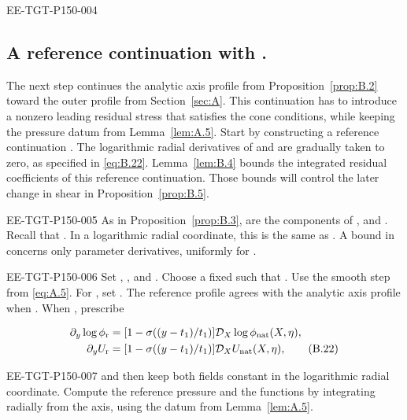 \begin{EESegment}{EE-TGT-P150-004}
\subsection{A reference continuation with
.}\label{sec:B.5}
The next step continues the analytic axis profile from Proposition~\ref{prop:B.2} toward the outer
profile from Section~\ref{sec:A}. This continuation has to introduce a nonzero leading residual
stress  that satisfies the cone conditions, while keeping the
pressure datum  from Lemma~\ref{lem:A.5}. Start by constructing a
reference continuation . The logarithmic radial
derivatives of  and  are gradually taken to zero,
as specified in \eqref{eq:B.22}. Lemma~\ref{lem:B.4} bounds the integrated residual coefficients
of this reference continuation. Those bounds will control the later change in shear in
Proposition~\ref{prop:B.5}.
\end{EESegment}

\begin{EESegment}{EE-TGT-P150-005}
As in Proposition~\ref{prop:B.3},  are the components of
, and . Recall that
. In a logarithmic radial coordinate, this is the same
as . A bound in  concerns only
parameter derivatives, uniformly for .
\end{EESegment}

\begin{EESegment}{EE-TGT-P150-006}
Set , , and
. Choose a fixed  such that
. Use the smooth step  from
\eqref{eq:A.5}. For , set
. The reference profile agrees with the analytic axis profile
when . When , prescribe
\end{EESegment}
\begin{align}
  \partial_y\log\phi_{\mathrm r}
    &=[1-\sigma((y-t_1)/t_1)]\mathcal D_X\log\phi_{\mathrm{nat}}(X,\eta),\notag\\
  \partial_yU_{\mathrm r}
    &=[1-\sigma((y-t_1)/t_1)]\mathcal D_XU_{\mathrm{nat}}(X,\eta),
  \tag{B.22}\label{eq:B.22}
\end{align}
\begin{EESegment}{EE-TGT-P150-007}
and then keep both fields constant in the logarithmic radial coordinate. Compute the reference
pressure and the functions  by integrating radially from the axis,
using the datum from Lemma~\ref{lem:A.5}.
\end{EESegment}

